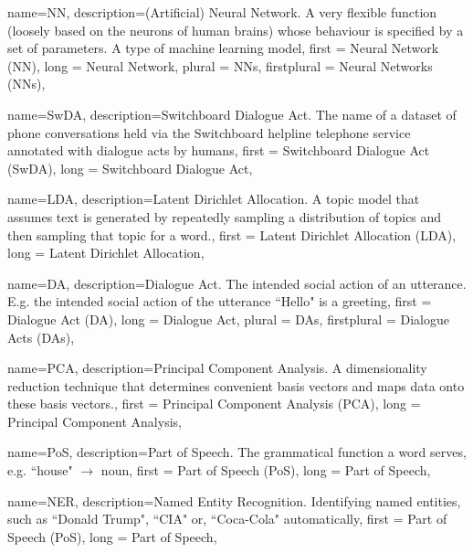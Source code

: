 {
        name=NN,
        description={(Artificial) Neural Network. A very flexible function (loosely based on the neurons of human brains) whose behaviour is specified by a set of parameters. A type of machine learning model},
        first = {Neural Network (NN)},
        long = {Neural Network},
        plural = {NNs},
        firstplural = {Neural Networks (NNs)},
}

{
        name=SwDA,
        description={Switchboard Dialogue Act. The name of a dataset of phone conversations held via the Switchboard helpline telephone service annotated with dialogue acts by humans},
        first = {Switchboard Dialogue Act (SwDA)},
        long = {Switchboard Dialogue Act},
}

{
        name=LDA,
        description={Latent Dirichlet Allocation. A topic model that assumes text is generated by repeatedly sampling a distribution of topics and then sampling that topic for a word.},
        first = {Latent Dirichlet Allocation (LDA)},
        long = {Latent Dirichlet Allocation},
}

{
        name=DA,
        description={Dialogue Act. The intended social action of an utterance. E.g. the intended social action of the utterance ``Hello" is a greeting},
        first = {Dialogue Act (DA)},
        long = {Dialogue Act},
        plural = {DAs},
        firstplural = {Dialogue Acts (DAs)},
}

{
        name=PCA,
        description={Principal Component Analysis. A dimensionality reduction technique that determines convenient basis vectors and maps data onto these basis vectors.},
        first = {Principal Component Analysis (PCA)},
        long = {Principal Component Analysis},
}

{
        name=PoS,
        description={Part of Speech. The grammatical function a word serves, e.g. ``house" $\rightarrow$ noun},
        first = {Part of Speech (PoS)},
        long = {Part of Speech},
}

{
        name=NER,
        description={Named Entity Recognition. Identifying named entities, such as ``Donald Trump", ``CIA" or, ``Coca-Cola" automatically},
        first = {Part of Speech (PoS)},
        long = {Part of Speech},
}



